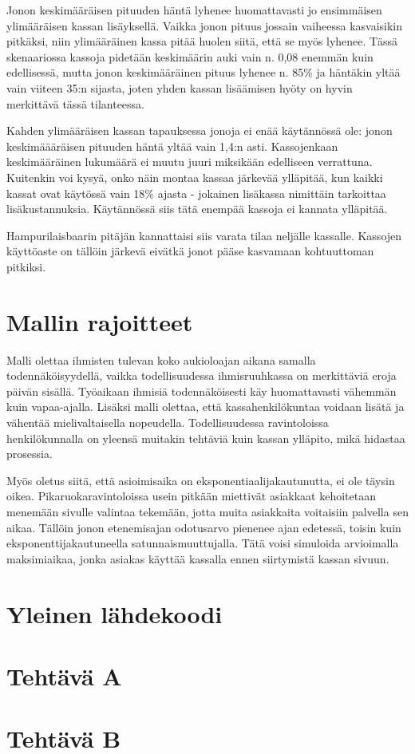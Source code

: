 \documentclass{article}     %
\begin{document}
Jonon keskimääräisen pituuden häntä lyhenee huomattavasti jo ensimmäisen ylimääräisen kassan lisäyksellä. Vaikka jonon pituus jossain vaiheessa kasvaisikin pitkäksi, niin ylimääräinen kassa pitää huolen siitä, että se myös lyhenee. Tässä skenaariossa kassoja pidetään keskimäärin auki vain n. 0,08 enemmän kuin edellisessä, mutta jonon keskimääräinen pituus lyhenee n. 85\% ja häntäkin yltää vain viiteen 35:n sijasta, joten yhden kassan lisäämisen hyöty on hyvin merkittävä tässä tilanteessa.

Kahden ylimääräisen kassan tapauksessa jonoja ei enää käytännössä ole: jonon keskimäääräisen pituuden häntä yltää vain 1,4:n asti. Kassojenkaan keskimääräinen lukumäärä ei muutu juuri miksikään edelliseen verrattuna. Kuitenkin voi kysyä, onko näin montaa kassaa järkevää ylläpitää, kun kaikki kassat ovat käytössä vain 18\% ajasta - jokainen lisäkassa nimittäin tarkoittaa lisäkustannuksia. Käytännössä siis tätä enempää kassoja ei kannata ylläpitää.

Hampurilaisbaarin pitäjän kannattaisi siis varata tilaa neljälle kassalle. Kassojen käyttöaste on tällöin järkevä eivätkä jonot pääse kasvamaan kohtuuttoman pitkiksi.

\section*{Mallin rajoitteet}
Malli olettaa ihmisten tulevan koko aukioloajan aikana samalla todennäköisyydellä, vaikka todellisuudessa ihmisruuhkassa on merkittäviä eroja päivän sisällä. Työaikaan ihmisiä todennäköisesti käy huomattavasti vähemmän kuin vapaa-ajalla. Lisäksi malli olettaa, että kassahenkilökuntaa voidaan lisätä ja vähentää mielivaltaisella nopeudella. Todellisuudessa ravintoloissa henkilökunnalla on yleensä muitakin tehtäviä kuin kassan ylläpito, mikä hidastaa prosessia.

Myös oletus siitä, että asioimisaika on eksponentiaalijakautunutta, ei ole täysin oikea. Pikaruokaravintoloissa usein pitkään miettivät asiakkaat kehoitetaan menemään sivulle valintaa tekemään, jotta muita asiakkaita voitaisiin palvella sen aikaa. Tällöin jonon etenemisajan odotusarvo pienenee ajan edetessä, toisin kuin eksponenttijakautuneella satunnaismuuttujalla. Tätä voisi simuloida arvioimalla maksimiaikaa, jonka asiakas käyttää kassalla ennen siirtymistä kassan sivuun.

\newpage

\appendix

\section{Yleinen lähdekoodi}





\section{Tehtävä A}



\section{Tehtävä B}
\end{document}
